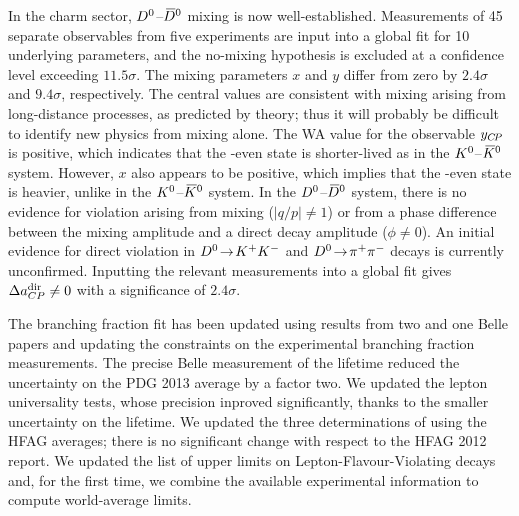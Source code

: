 In the charm sector, $D^0$--$\kern 0.2em\overline{\kern -0.2em D}{}^0$ mixing is now well-established.
Measurements of 45 separate observables from five experiments are input 
into a global fit for 10 underlying parameters, and the no-mixing 
hypothesis is excluded at a confidence level exceeding $11.5\sigma$. 
The mixing parameters $x$ and $y$ differ from zero by 
$2.4\sigma$ and $9.4\sigma$, respectively. The central values are 
consistent with mixing arising from long-distance processes, as
predicted by theory; thus it will probably be difficult to identify 
new physics from mixing alone. The WA value for the observable $y_{C\!P}$ 
is positive, which indicates that the \CP-even state is shorter-lived 
as in the $K^0$--$\kern 0.2em\overline{\kern -0.2em K}{}^0$ system. However, $x$ also appears to be 
positive, which implies that the \CP-even state is heavier, 
unlike in the $K^0$--$\kern 0.2em\overline{\kern -0.2em K}{}^0$ system. 
%
In the $D^0$--$\kern 0.2em\overline{\kern -0.2em D}{}^0$ system, 
there is no evidence for \CP violation arising from mixing ($|q/p|\neq 1$) or 
from a phase difference between the mixing amplitude and 
a direct decay amplitude ($\phi\neq 0$). An initial evidence for direct
\CP violation in $D^0\!\rightarrow\! K^+K^-$ and $D^0\!\rightarrow\! \pi^+\pi^-$ decays is currently unconfirmed. 
Inputting the relevant measurements into a global 
fit gives $\Delta a^{\rm dir}_{CP}\neq 0$ with a significance 
of $2.4\sigma$.

The \mtau branching fraction fit has been updated using results from two
\babar and one Belle papers and updating the constraints on
the experimental branching fraction measurements.
The precise Belle measurement of the \mtau
lifetime reduced the uncertainty on the PDG 2013 average by a factor
two. We updated the lepton universality tests, whose precision inproved
significantly, thanks to the smaller uncertainty on the \mtau lifetime.
We updated the three determinations of \Vus using the \mtau HFAG averages;
there is no significant change with respect to the HFAG 2012 report.
We updated the list of upper limits on \mtau Lepton-Flavour-Violating
decays and, for the first time, we combine the available experimental
information to compute world-average limits.
